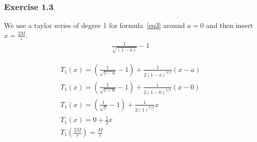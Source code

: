 \documentclass[reprint,english,notitlepage]{revtex4-2}
\begin{document}
        \subsubsection{Exercise 1.3}\label{subsec:exercise-1.3}
            We use a taylor series of degree 1 for formula~\eqref{eq3} around $a = 0$ and then insert $x = \frac{2M}{r}$.
            \begin{align}
                \frac{1}{\sqrt{\left(1-a \right)}}-1 \label{eq3}
            \end{align}

            \begin{align}
                T_1(x) = \left(\frac{1}{\sqrt{1-a}}-1 \right) + \frac{1}{2(1-a)^{3/2}}(x-a)\\
                T_1(x) = \left(\frac{1}{\sqrt{1-0}}-1 \right) + \frac{1}{2(1-0)^{3/2}}(x-0)\\
                T_1(x) = \left(\frac{1}{\sqrt{1}}-1 \right) + \frac{1}{2(1)^{3/2}}x\\
                T_1(x) = 0 + \frac{1}{2}x\\
                T_1\left(\frac{2M}{r}\right) = \frac{M}{r}
            \end{align}
\clearpage
\newpage
\printbibliography
\end{document}
